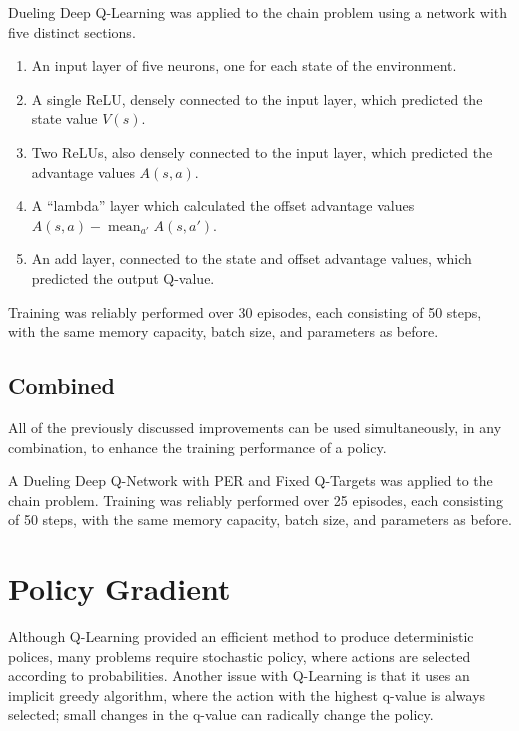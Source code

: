 Dueling Deep Q-Learning was applied to the chain problem using a network with
five distinct sections.
\begin{enumerate}
    \item An input layer of five neurons, one for each state of the environment.
    \item A single ReLU, densely connected to the input layer, which
        predicted the state value $V(s)$.
    \item Two ReLUs, also densely connected to the input layer, which
        predicted the advantage values $A(s,a)$.
    \item A ``lambda'' layer which calculated the offset advantage values
        $A(s,a) - \operatorname{mean}_{a'} A(s,a')$.
    \item An add layer, connected to the state and offset advantage values,
        which predicted the output Q-value.
\end{enumerate}
Training was reliably performed over 30 episodes, each consisting of 50 steps,
with the same memory capacity, batch size, and parameters as before.



\subsection{Combined}

All of the previously discussed improvements can be used simultaneously, in any
combination, to enhance the training performance of a policy.

A Dueling Deep Q-Network with PER and Fixed Q-Targets was applied to the chain
problem.
Training was reliably performed over 25 episodes, each consisting of 50 steps,
with the same memory capacity, batch size, and parameters as before.



\section{Policy Gradient}

Although Q-Learning provided an efficient method to produce deterministic
polices, many problems require stochastic policy, where actions are selected
according to probabilities.
Another issue with Q-Learning is that it uses an implicit greedy algorithm,
where the action with the highest q-value is always selected; small changes in
the q-value can radically change the policy.

